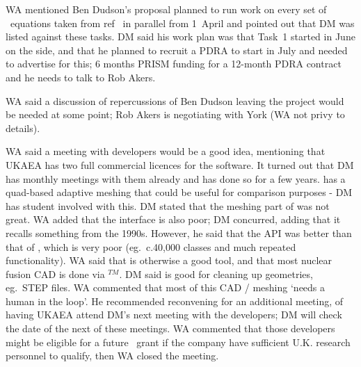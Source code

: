 WA mentioned Ben Dudson's proposal planned to run work on every set of \papp\ equations
taken from ref~\cite{pappeqs}  in parallel 
from 1~April  and pointed out that DM was listed against these tasks.  DM said his work plan 
was that Task~1 started in June on the  side, and that he planned 
to recruit a PDRA to start in July and needed to advertise for this; 6 months 
PRISM funding for a 12-month PDRA contract and he needs to talk to Rob Akers.

WA said a discussion of repercussions of Ben Dudson leaving the project would 
be needed at some point; Rob Akers is negotiating with York (WA not privy to 
details).  

WA said a meeting with  developers would be a good idea, mentioning 
that UKAEA has two full commercial licences for the software.  It turned out 
that DM has monthly meetings with them already and has done so for a few years. 
  has a quad-based adaptive meshing that could be useful for 
comparison purposes - DM has student involved with this.  DM stated that the 
meshing part of  was not great.  WA added that the  
interface is also poor; DM concurred, adding that it recalls something from the 
1990s. However, he said that the API was better than that of , which is very poor (eg.\ c.40,000 classes and much repeated 
functionality).  WA said that  is otherwise a good tool, and that most 
nuclear fusion CAD is done via $^{TM}$.  DM said  is good for cleaning up geometries, eg.\ STEP files.  WA commented that 
most of this CAD / meshing `needs a human in the loop'.  He recommended 
reconvening for an additional meeting, of having UKAEA attend DM's next meeting 
with the  developers; DM will check the date of the next of these 
meetings.  WA commented that those developers might be eligible for a future 
\nep\  grant if the company have sufficient U.K. research personnel to qualify, then WA 
closed the meeting.


